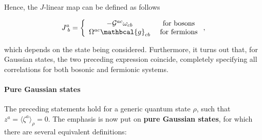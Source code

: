 \documentclass{homework}
\begin{document}
Hence, the $J$-linear map can be defined as follows 

\begin{equation}
    J^{a}_{\blanky b} = \left\{
    \begin{array}{cc}
         -\mathcal{G}^{ac} \omega_{cb} & \textnormal{ for bosons} \\
         \Omega^{ac} \mathbcal{g}_{cb} & \textnormal{ for fermions}
    \end{array}
    \right.,
\end{equation}

which depends on the state being considered. Furthermore, it turns out that, for Gaussian states, the two preceding expression coincide, completely specifying all correlations for both bosonic and fermionic systems. \bigbreak

\paragraph{Pure Gaussian states}

The preceding statements hold for a generic quantum state $\rho$, such that $z^a = \langle \zeta^a \rangle_{\rho} = 0$. The emphasis is now put on \textbf{pure Gaussian states}, for which there are several equivalent definitions:
\end{document}
